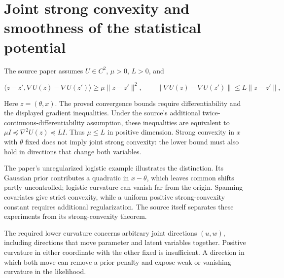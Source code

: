 \documentclass[11pt,a4paper]{article}
\begin{document}
\section{\texorpdfstring{Joint strong convexity and smoothness of the statistical potential}{Joint strong convexity and smoothness of the statistical potential}}


The source paper assumes \(U\in C^2\), \(\mu>0\), \(L>0\), and


\[\langle z-z',\nabla U(z)-\nabla U(z')\rangle
\ge\mu\|z-z'\|^2,\qquad
\|\nabla U(z)-\nabla U(z')\|\le L\|z-z'\|,\]


Here \(z=(\theta,x)\). The proved convergence bounds require differentiability and the displayed gradient inequalities. Under the source’s additional twice-continuous-differentiability assumption, these inequalities are equivalent to
\(\mu I\preceq\nabla^2U(z)\preceq LI\). Thus \(\mu\le L\) in positive
dimension. Strong convexity in \(x\) with \(\theta\) fixed does not imply joint strong convexity: the lower bound must also hold in directions that change both variables.




The paper's unregularized logistic example illustrates the distinction.
Its Gaussian prior contributes a quadratic in \(x-\theta\), which leaves
common shifts partly uncontrolled; logistic curvature can vanish far from the
origin. Spanning covariates give strict convexity, while a uniform positive
strong-convexity constant requires additional regularization. The source itself
separates these experiments from its strong-convexity theorem.



The required lower curvature concerns arbitrary joint directions \((u,w)\), including directions that move parameter and latent variables together. Positive curvature in either coordinate with the other fixed is insufficient. A direction in which both move can remove a prior penalty and expose weak or vanishing curvature in the likelihood.
\end{document}
